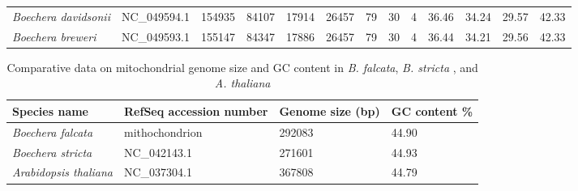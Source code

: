 \documentclass[9pt,twocolumn,twoside,lineno]{gsag3jnl}
\begin{document}
\begin{table}[p]
\begin{tableminipage}{\textwidth}
\begin{tabularx}{\textwidth}{@{}l l XXXXXXXXXXX@{}}
\textit{Boechera davidsonii}    & NC\_049594.1                     & 154935                    & 84107                    & 17914                    & 26457                   & 79           & 30             & 4              & 36.46                        & 34.24               & 29.57               & 42.33              \\
\textit{Boechera breweri}       & NC\_049593.1                     & 155147                    & 84347                    & 17886                    & 26457                   & 79           & 30             & 4              & 36.44                        & 34.21               & 29.56               & 42.33              \\
\hline
\end{tabularx}
\label{tab:chloroplast_compare}
\end{tableminipage}
\end{table}

\begin{table}[p]
\centering
\caption{Comparative data on mitochondrial genome size and GC content in \textit{B. falcata}, \textit{B. stricta} , and \textit{A. thaliana}}
\begin{tableminipage}{\textwidth}
\begin{tabularx}{\textwidth}{@{}XXXX@{}}
\hline
\textbf{Species name}         & \textbf{RefSeq accession number} & \textbf{Genome size (bp)} & \textbf{GC content \%} \\
\hline
\textit{Boechera falcata}     & mithochondrion                   & 292083                    & 44.90                  \\
\textit{Boechera stricta}      & NC\_042143.1                     & 271601                    & 44.93                  \\
\textit{Arabidopsis thaliana} & NC\_037304.1                     & 367808                    & 44.79                 \\
\hline
\end{tabularx}
\label{tab:mito_compare}
\end{tableminipage}
\end{table}
\end{document}
